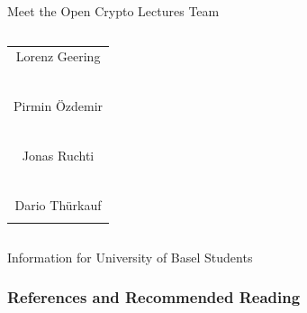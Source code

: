 \documentclass[handout]{beamer}
\begin{document}
\begin{frame}{Meet the Open Crypto Lectures Team}
\begin{columns}[T]
\begin{column}{0.31\textwidth}
\begin{table}
\begin{tabular}{c}
					Lorenz Geering\\
					\href{https://linkedin.com/in/lorenz-geering-770359a8/}{\faLinkedinSquare}\ \href{https://twitter.com/lorenz_geering}{\faTwitterSquare}\\
					\vspace{0.5em}\\
					Pirmin Özdemir\\
					\href{https://www.linkedin.com/in/pirmin-\%C3\%B6zdemir-539845159/}{\faLinkedinSquare}\ \href{https://twitter.com/Pirmin15}{\faTwitterSquare}\\
					\vspace{0.5em}\\
					Jonas Ruchti\\
					\href{https://linkedin.com/in/jonas-ruchti-a29042221}{\faLinkedinSquare}\ \href{https://twitter.com/jonas_ruchti}{\faTwitterSquare}\\
					\vspace{0.5em}\\
					Dario Thürkauf\\
					\href{https://linkedin.com/in/dario-thuerkauf/}{\faLinkedinSquare} \href{https://twitter.com/dario_thuerkauf}{\faTwitterSquare}\\
				\end{tabular}
			\end{table}
		\end{column}
	\end{columns}
\end{frame}

\begin{frame}{Information for University of Basel Students}

	

	

\vspace{1em}


\end{frame}

\begin{frame}%
\frametitle{References and Recommended Reading}
	
	
\end{frame}
\end{document}
